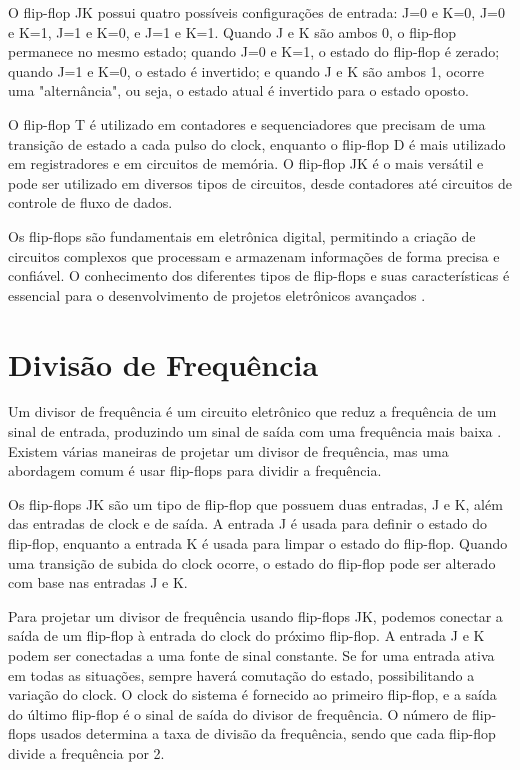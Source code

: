 O flip-flop JK possui quatro possíveis configurações de entrada: J=0 e K=0, J=0 e K=1, J=1 e K=0, e J=1 e K=1. Quando J e K são ambos 0, o flip-flop permanece no mesmo estado; quando J=0 e K=1, o estado do flip-flop é zerado; quando J=1 e K=0, o estado é invertido; e quando J e K são ambos 1, ocorre uma "alternância", ou seja, o estado atual é invertido para o estado oposto.

O flip-flop T é utilizado em contadores e sequenciadores que precisam de uma transição de estado a cada pulso do clock, enquanto o flip-flop D é mais utilizado em registradores e em circuitos de memória. O flip-flop JK é o mais versátil e pode ser utilizado em diversos tipos de circuitos, desde contadores até circuitos de controle de fluxo de dados.

Os flip-flops são fundamentais em eletrônica digital, permitindo a criação de circuitos complexos que processam e armazenam informações de forma precisa e confiável. O conhecimento dos diferentes tipos de flip-flops e suas características é essencial para o desenvolvimento de projetos eletrônicos avançados \cite{tocci2010sistemas}.

\section{Divisão de Frequência}
\label{divisorDeFrequencia}
Um divisor de frequência é um circuito eletrônico que reduz a frequência de um sinal de entrada, produzindo um sinal de saída com uma frequência mais baixa \cite{gouveia2017divisor}. Existem várias maneiras de projetar um divisor de frequência, mas uma abordagem comum é usar flip-flops para dividir a frequência.

Os flip-flops JK são um tipo de flip-flop que possuem duas entradas, J e K, além das entradas de clock e de saída. A entrada J é usada para definir o estado do flip-flop, enquanto a entrada K é usada para limpar o estado do flip-flop. Quando uma transição de subida do clock ocorre, o estado do flip-flop pode ser alterado com base nas entradas J e K.

Para projetar um divisor de frequência usando flip-flops JK, podemos conectar a saída de um flip-flop à entrada do clock do próximo flip-flop. A entrada J e K podem ser conectadas a uma fonte de sinal constante. Se for uma entrada ativa em todas as situações, sempre haverá comutação do estado, possibilitando a variação do clock. O clock do sistema é fornecido ao primeiro flip-flop, e a saída do último flip-flop é o sinal de saída do divisor de frequência. O número de flip-flops usados determina a taxa de divisão da frequência, sendo que cada flip-flop divide a frequência por 2.

